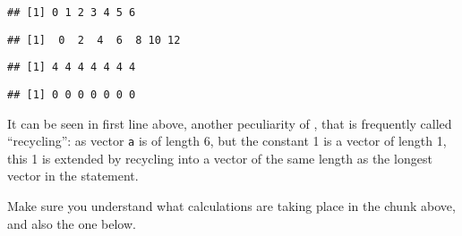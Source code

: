 \documentclass[paper=a4,10pt,div=17,headsepline,BCOR=12mm,twoside,open=right]{scrbook}\usepackage{knitr}
\begin{document}
\begin{knitrout}\footnotesize
{}\color{fgcolor}\begin{kframe}
\begin{alltt}
 \hlopt{+}  
\end{alltt}
\begin{verbatim}
## [1] 0 1 2 3 4 5 6
\end{verbatim}
\begin{alltt}
 \hlopt{+} \hlstd{)} \hlopt{*} 
\end{alltt}
\begin{verbatim}
## [1]  0  2  4  6  8 10 12
\end{verbatim}
\begin{alltt}
 \hlopt{+} 
\end{alltt}
\begin{verbatim}
## [1] 4 4 4 4 4 4 4
\end{verbatim}
\begin{alltt}
 \hlopt{-} 
\end{alltt}
\begin{verbatim}
## [1] 0 0 0 0 0 0 0
\end{verbatim}
\end{kframe}
\end{knitrout}

It can be seen in first line above, another peculiarity of \R, that is frequently called ``recycling'': as vector \texttt{a} is of length 6, but the constant 1 is a vector of length 1, this 1 is extended by recycling into a vector of the same length as the longest vector in the statement.

Make sure you understand what calculations are taking place in the chunk above, and also the one below.
\end{document}
